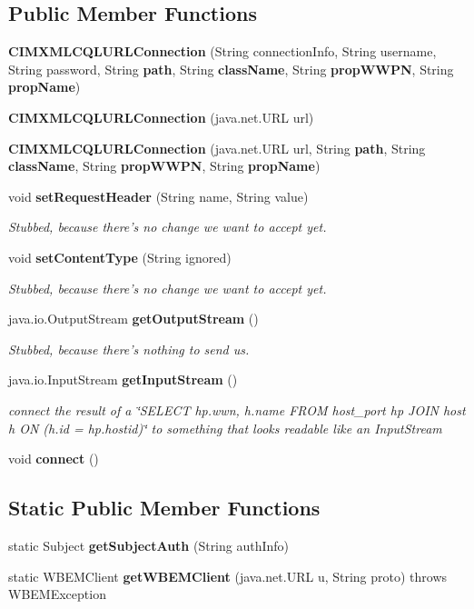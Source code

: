 \subsection*{Public Member Functions}
\begin{DoxyCompactItemize}
\item 
{\bf C\+I\+M\+X\+M\+L\+C\+Q\+L\+U\+R\+L\+Connection} (String connection\+Info, String username, String password, String {\bf path}, String {\bf class\+Name}, String {\bf prop\+W\+W\+P\+N}, String {\bf prop\+Name})
\item 
{\bf C\+I\+M\+X\+M\+L\+C\+Q\+L\+U\+R\+L\+Connection} (java.\+net.\+U\+R\+L url)
\item 
{\bf C\+I\+M\+X\+M\+L\+C\+Q\+L\+U\+R\+L\+Connection} (java.\+net.\+U\+R\+L url, String {\bf path}, String {\bf class\+Name}, String {\bf prop\+W\+W\+P\+N}, String {\bf prop\+Name})
\item 
void {\bf set\+Request\+Header} (String name, String value)
\begin{DoxyCompactList}\small\item\em Stubbed, because there's no change we want to accept yet. \end{DoxyCompactList}\item 
void {\bf set\+Content\+Type} (String ignored)
\begin{DoxyCompactList}\small\item\em Stubbed, because there's no change we want to accept yet. \end{DoxyCompactList}\item 
java.\+io.\+Output\+Stream {\bf get\+Output\+Stream} ()
\begin{DoxyCompactList}\small\item\em Stubbed, because there's nothing to send us. \end{DoxyCompactList}\item 
java.\+io.\+Input\+Stream {\bf get\+Input\+Stream} ()
\begin{DoxyCompactList}\small\item\em connect the result of a \char`\"{}\+S\+E\+L\+E\+C\+T hp.\+wwn, h.\+name F\+R\+O\+M host\+\_\+port hp J\+O\+I\+N host h O\+N (h.\+id = hp.\+hostid)\char`\"{} to something that looks readable like an Input\+Stream \end{DoxyCompactList}\item 
void {\bf connect} ()
\end{DoxyCompactItemize}
\subsection*{Static Public Member Functions}
\begin{DoxyCompactItemize}
\item 
static Subject {\bf get\+Subject\+Auth} (String auth\+Info)
\item 
static W\+B\+E\+M\+Client {\bf get\+W\+B\+E\+M\+Client} (java.\+net.\+U\+R\+L u, String proto)  throws W\+B\+E\+M\+Exception     
\end{DoxyCompactItemize}
